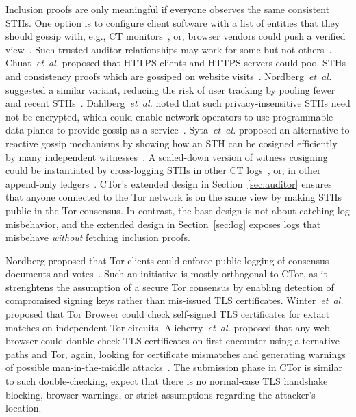 Inclusion proofs are only meaningful if everyone observes the same consistent
STHs.
One option is to configure client software with a list of entities that they
should gossip with, e.g., CT monitors~\cite{chase}, or,
browser vendors could push a verified view~\cite{sth-push}.
Such trusted auditor relationships may work for some but not
others~\cite{nordberg}.
Chuat~\emph{et~al.} proposed that HTTPS clients and HTTPS servers could pool
STHs and consistency proofs which are gossiped on website visits~\cite{chuat}.
Nordberg~\emph{et~al.} suggested a similar variant, reducing the risk of user
tracking by pooling fewer and recent STHs~\cite{nordberg}.
Dahlberg~\emph{et~al.} noted that such privacy-insensitive STHs need not be
encrypted, which could enable network operators to use programmable data planes
to provide gossip as-a-service~\cite{dahlberg}.
Syta~\emph{et~al.} proposed an alternative to reactive gossip mechanisms by
showing how an STH can be cosigned efficiently by many independent
witnesses~\cite{syta}.
A scaled-down version of witness cosigning could be instantiated by
cross-logging STHs in other CT logs~\cite{minimal-gossip},
or, in other append-only ledgers~\cite{catena}.
CTor's extended design in Section~\ref{sec:auditor} ensures that anyone
connected to the Tor network is on the same view by making STHs public in the
Tor consensus.  In contrast, the base design is not about catching log
misbehavior, and the extended design in Section~\ref{sec:log} exposes logs
that misbehave \emph{without} fetching inclusion proofs.

Nordberg proposed that Tor clients could enforce public logging of consensus
documents and votes~\cite{consensus-transparency}.  Such an initiative is
mostly orthogonal to CTor, as it strenghtens the assumption of a secure Tor
consensus by enabling detection of compromised signing keys rather than
mis-issued TLS certificates.  Winter~\emph{et~al.} proposed that Tor Browser
could check self-signed TLS certificates for extact matches on independent Tor
circuits.  Alicherry~\emph{et~al.} proposed that any web browser could
double-check TLS certificates on first encounter using alternative paths and
Tor, again, looking for certificate mismatches and generating warnings of
possible man-in-the-middle attacks~\cite{doublecheck}.  The submission phase in
CTor is similar to such double-checking, expect that there is no normal-case TLS
handshake blocking, browser warnings, or strict assumptions regarding the
attacker's location.
